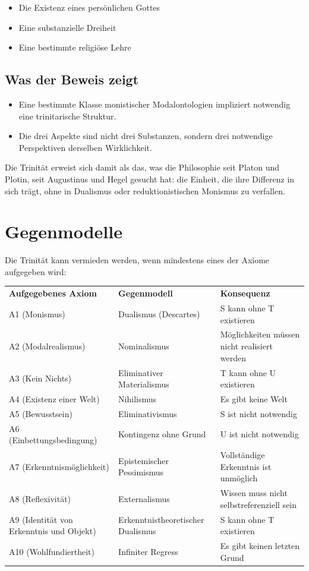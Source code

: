 \documentclass[
]{article}
\begin{document}
\begin{itemize}
\item Die Existenz eines persönlichen Gottes
\item Eine substanzielle Dreiheit
\item Eine bestimmte religiöse Lehre
\end{itemize}

\subsection{Was der Beweis zeigt}\label{was-der-beweis-zeigt}

\begin{itemize}
\item Eine bestimmte Klasse monistischer Modalontologien impliziert notwendig eine trinitarische Struktur.
\item Die drei Aspekte sind nicht drei Substanzen, sondern drei notwendige Perspektiven derselben Wirklichkeit.
\end{itemize}

Die Trinität erweist sich damit als das, was die Philosophie seit Platon und Plotin, seit Augustinus und Hegel gesucht hat: die Einheit, die ihre Differenz in sich trägt, ohne in Dualismus oder reduktionistischen Monismus zu verfallen.

\section{Gegenmodelle}\label{gegenmodelle}

Die Trinität kann vermieden werden, wenn mindestens eines der Axiome aufgegeben wird:

\begin{tabular}{lll}
\textbf{Aufgegebenes Axiom} & \textbf{Gegenmodell} & \textbf{Konsequenz} \\
A1 (Monismus) & Dualismus (Descartes) & S kann ohne T existieren \\
A2 (Modalrealismus) & Nominalismus & Möglichkeiten müssen nicht realisiert werden \\
A3 (Kein Nichts) & Eliminativer Materialismus & T kann ohne U existieren \\
A4 (Existenz einer Welt) & Nihilismus & Es gibt keine Welt \\
A5 (Bewusstsein) & Eliminativismus & S ist nicht notwendig \\
A6 (Einbettungsbedingung) & Kontingenz ohne Grund & U ist nicht notwendig \\
A7 (Erkenntnismöglichkeit) & Epistemischer Pessimismus & Vollständige Erkenntnis ist unmöglich \\
A8 (Reflexivität) & Externalismus & Wissen muss nicht selbstreferenziell sein \\
A9 (Identität von Erkenntnis und Objekt) & Erkenntnistheoretischer Dualismus & S kann ohne T existieren \\
A10 (Wohlfundiertheit) & Infiniter Regress & Es gibt keinen letzten Grund \\
\end{tabular}
\end{document}
